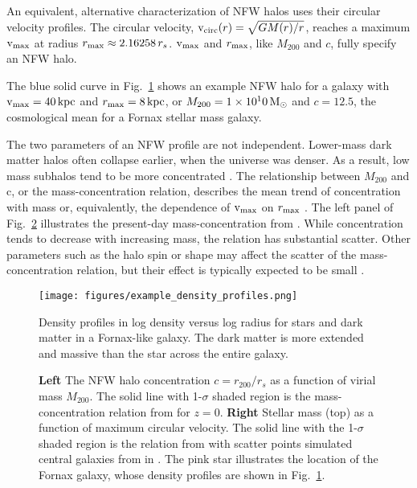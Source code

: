 An equivalent, alternative characterization of NFW halos uses their
circular velocity profiles. The circular velocity,
\({\rm v}_{\rm circ}(r) = \sqrt{G M(r) / r}\), reaches a maximum \({\rm v}_{\rm max}\) at radius
\(r_{\rm max} \approx 2.16258\,r_s\). \({\rm v}_{\rm max}\) and \(r_{\rm max}\), like
\(M_{200}\) and \(c\), fully specify an NFW halo.

The blue solid curve in Fig.~\ref{fig:nfw_density} shows an example NFW
halo for a galaxy with \({\rm v}_{\rm max}=40\,{\rm kpc}\) and \(r_{\rm max}=8\,{\rm kpc}\), or
\(M_{200} = 1\times10^10\,{\rm M}_{\odot}\) and \(c=12.5\), the cosmological mean
for a Fornax stellar mass galaxy.

The two parameters of an NFW profile are not independent. Lower-mass
dark matter halos often collapse earlier, when the universe was denser.
As a result, low mass subhalos tend to be more concentrated
\citep[e.g.,][]{NFW1997}. The relationship between \(M_{200}\) and c, or
the mass-concentration relation, describes the mean trend of
concentration with mass or, equivalently, the dependence of \({\rm v}_{\rm max}\) on
\(r_{\rm max}\) \citep[e.g.,][]{bullock+2001, ludlow+2016}. The left panel of
Fig.~\ref{fig:smhm} illustrates the present-day mass-concentration from
\citet{ludlow+2016}. While concentration tends to decrease with
increasing mass, the relation has substantial scatter. Other parameters
such as the halo spin or shape may affect the scatter of the
mass-concentration relation, but their effect is typically expected to
be small \citep{navarro+2010, dicintio+2013, dutton+maccio2014}.

\begin{figure}
\centering
\texttt{[image: figures/example\_density\_profiles.png]}
\caption[Example density profiles]{Density profiles in log density
versus log radius for stars and dark matter in a Fornax-like galaxy. The
dark matter is more extended and massive than the star across the entire
galaxy.}\label{fig:nfw_density}
\end{figure}

\begin{figure}
\centering
{}
\caption[Stellar-mass halo-mass relation]{\textbf{Left} The NFW halo
concentration \(c=r_{200} / r_s\) as a function of virial mass
\(M_{200}\). The solid line with 1-\(\sigma\) shaded region is the
mass-concentration relation from \citet{ludlow+2016} for \(z=0\).
\textbf{Right} Stellar mass (top) as a function of maximum circular
velocity. The solid line with the 1-\(\sigma\) shaded region is the
relation from \citet{fattahi+2018} with scatter points simulated central
galaxies from \apostle{} in \citet{fattahi+2018}. The pink star
illustrates the location of the Fornax galaxy, whose density profiles
are shown in Fig.~\ref{fig:nfw_density}.}\label{fig:smhm}
\end{figure}

